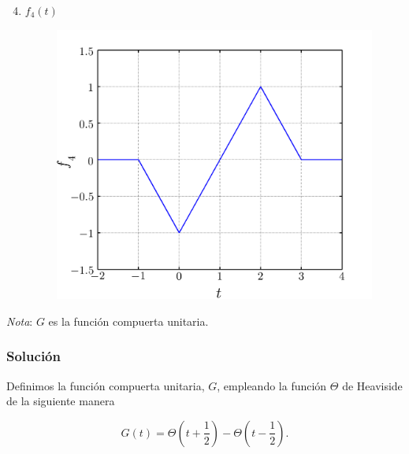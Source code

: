 \documentclass[a4paper,12pt,final]{article}
\begin{document}
      \begin{minipage}[t]{0.5\textwidth}
        \begin{enumerate}[label=\alph*)]
          \setcounter{enumi}{3}
          \item $f_4\left(t\right)$
            \vspace{-1.0em}
            \begin{figure}[H]
              \begin{flushright}
                \includegraphics[width=\textwidth-30pt]{./laboratorio_4/problema01_f4.png}
              \end{flushright}
            \end{figure}\vspace{-1.0em}
        \end{enumerate}
      \end{minipage}%

      \noindent \emph{Nota}: $G$ es la función compuerta unitaria.

    \subsubsection*{Solución}

      \noindent Definimos la función compuerta unitaria, $G$, empleando la función
      $\Theta$ de Heaviside de la siguiente manera

      \begin{equation*}
         G\left(t\right) = \Theta\left(t + \frac{1}{2}\right) -
                           \Theta\left(t - \frac{1}{2}\right).
      \end{equation*}
\end{document}
